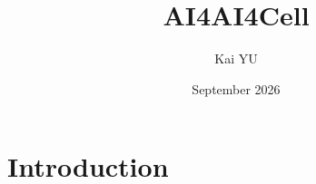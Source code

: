 \documentclass{article}
\title{AI4AI4Cell}
\author{Kai YU}
\date{September 2026}
\begin{document}
\maketitle

\section{Introduction}
\end{document}
